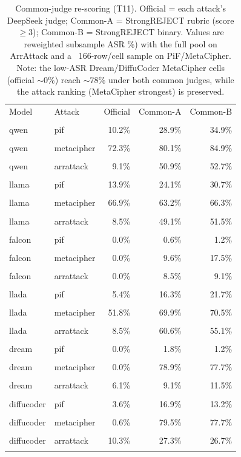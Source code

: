 \begin{table}[ht]
\centering
\small
\begin{tabular}{llrrr}
\toprule
Model & Attack & Official & Common-A & Common-B \\\\
\midrule
qwen & pif & 10.2\% & 28.9\% & 34.9\% \\\\
qwen & metacipher & 72.3\% & 80.1\% & 84.9\% \\\\
qwen & arrattack & 9.1\% & 50.9\% & 52.7\% \\\\
llama & pif & 13.9\% & 24.1\% & 30.7\% \\\\
llama & metacipher & 66.9\% & 63.2\% & 66.3\% \\\\
llama & arrattack & 8.5\% & 49.1\% & 51.5\% \\\\
falcon & pif & 0.0\% & 0.6\% & 1.2\% \\\\
falcon & metacipher & 0.0\% & 9.6\% & 17.5\% \\\\
falcon & arrattack & 0.0\% & 8.5\% & 9.1\% \\\\
llada & pif & 5.4\% & 16.3\% & 21.7\% \\\\
llada & metacipher & 51.8\% & 69.9\% & 70.5\% \\\\
llada & arrattack & 8.5\% & 60.6\% & 55.1\% \\\\
dream & pif & 0.0\% & 1.8\% & 1.2\% \\\\
dream & metacipher & 0.0\% & 78.9\% & 77.7\% \\\\
dream & arrattack & 6.1\% & 9.1\% & 11.5\% \\\\
diffucoder & pif & 3.6\% & 16.9\% & 13.2\% \\\\
diffucoder & metacipher & 0.6\% & 79.5\% & 77.7\% \\\\
diffucoder & arrattack & 10.3\% & 27.3\% & 26.7\% \\\\
\bottomrule
\end{tabular}
\caption{Common-judge re-scoring (T11). Official = each attack's DeepSeek judge; Common-A = StrongREJECT rubric (score $\ge 3$); Common-B = StrongREJECT binary. Values are reweighted subsample ASR $\%$) with the full pool on ArrAttack and a ~166-row/cell sample on PiF/MetaCipher. Note: the low-ASR Dream/DiffuCoder MetaCipher cells (official $\sim$0\%) reach $\sim$78\% under both common judges, while the attack ranking (MetaCipher strongest) is preserved.}
\label{tab:common_judge}
\end{table}
